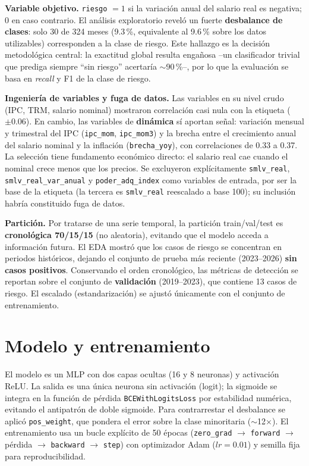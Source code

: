 \documentclass[11pt]{tg_usta}
\begin{document}
\textbf{Variable objetivo.} \texttt{riesgo} $= 1$ si la variación anual del salario real es negativa; $0$ en caso contrario. El análisis exploratorio reveló un fuerte \textbf{desbalance de clases}: solo 30 de 324 meses (9.3\,\%, equivalente al 9.6\,\% sobre los datos utilizables) corresponden a la clase de riesgo. Este hallazgo es la decisión metodológica central: la exactitud global resulta engañosa --un clasificador trivial que prediga siempre ``sin riesgo'' acertaría $\sim$90\,\%--, por lo que la evaluación se basa en \emph{recall} y F1 de la clase de riesgo.

\textbf{Ingeniería de variables y fuga de datos.} Las variables en su nivel crudo (IPC, TRM, salario nominal) mostraron correlación casi nula con la etiqueta ($\pm0.06$). En cambio, las variables de \textbf{dinámica} sí aportan señal: variación mensual y trimestral del IPC (\texttt{ipc\_mom}, \texttt{ipc\_mom3}) y la brecha entre el crecimiento anual del salario nominal y la inflación (\texttt{brecha\_yoy}), con correlaciones de 0.33 a 0.37. La selección tiene fundamento económico directo: el salario real cae cuando el nominal crece menos que los precios. Se excluyeron explícitamente \texttt{smlv\_real}, \texttt{smlv\_real\_var\_anual} y \texttt{poder\_adq\_index} como variables de entrada, por ser la base de la etiqueta (la tercera es \texttt{smlv\_real} reescalado a base 100); su inclusión habría constituido fuga de datos.

\textbf{Partición.} Por tratarse de una serie temporal, la partición train/val/test es \textbf{cronológica 70/15/15} (no aleatoria), evitando que el modelo acceda a información futura. El EDA mostró que los casos de riesgo se concentran en periodos históricos, dejando el conjunto de prueba más reciente (2023--2026) \textbf{sin casos positivos}. Conservando el orden cronológico, las métricas de detección se reportan sobre el conjunto de \textbf{validación} (2019--2023), que contiene 13 casos de riesgo. El escalado (estandarización) se ajustó únicamente con el conjunto de entrenamiento.

\section{Modelo y entrenamiento}

El modelo es un MLP con dos capas ocultas (16 y 8 neuronas) y activación ReLU. La salida es una única neurona sin activación (logit); la sigmoide se integra en la función de pérdida \texttt{BCEWithLogitsLoss} por estabilidad numérica, evitando el antipatrón de doble sigmoide. Para contrarrestar el desbalance se aplicó \texttt{pos\_weight}, que pondera el error sobre la clase minoritaria ($\sim$12$\times$). El entrenamiento usa un bucle explícito de 50 épocas (\texttt{zero\_grad} $\rightarrow$ \texttt{forward} $\rightarrow$ pérdida $\rightarrow$ \texttt{backward} $\rightarrow$ \texttt{step}) con optimizador Adam ($lr = 0.01$) y semilla fija para reproducibilidad.
\end{document}
